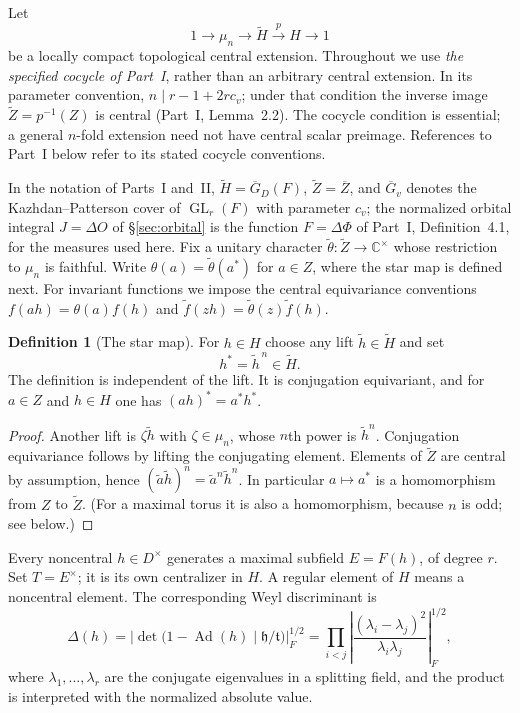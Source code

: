 \documentclass[11pt]{article}
\newcommand{\C}{\mathbb C}
\newcommand{\GL}{\operatorname{GL}}
\newcommand{\tH}{\widetilde H}
\newcommand{\tZ}{\widetilde Z}
\newcommand{\Gb}{\overline{G}}\newcommand{\GDb}{\overline{G}_D}\newcommand{\Zb}{\overline{Z}}
\theoremstyle{plain}
\theoremstyle{definition}
\newtheorem{definition}[theorem]{Definition}
\begin{document}
Let
\begin{equation}\label{eq:extension}
1\longrightarrow\mu_n\longrightarrow\tH\overset{p}{\longrightarrow}H\longrightarrow1
\end{equation}
be a locally compact topological central extension. Throughout we use \emph{the specified cocycle of Part~I}, rather than an arbitrary central extension. In its parameter convention, $n\mid r-1+2rc_v$; under that condition the inverse image $\tZ=p^{-1}(Z)$ is central (Part~I, Lemma~2.2). The cocycle condition is essential; a general $n$-fold extension need not have central scalar preimage. References to Part~I below refer to its stated cocycle conventions.

In the notation of Parts~I and~II, $\tH=\GDb(F)$, $\tZ=\Zb$, and $\Gb_v$ denotes the Kazhdan--Patterson cover of $\GL_r(F)$ with parameter $c_v$; the normalized orbital integral $J=\Delta O$ of \S\ref{sec:orbital} is the function $F=\Delta\Phi$ of Part~I, Definition~4.1, for the measures used here. Fix a unitary character $\widetilde\theta:\tZ\to\C^\times$ whose restriction to $\mu_n$ is faithful. Write $\theta(a)=\widetilde\theta(a^*)$ for $a\in Z$, where the star map is defined next. For invariant functions we impose the central equivariance conventions $f(ah)=\theta(a)f(h)$ and $\widetilde f(zh)=\widetilde\theta(z)\widetilde f(h)$.

\begin{definition}[The star map]\label{def:star}
For $h\in H$ choose any lift $\widetilde h\in\tH$ and set
\begin{equation}\label{eq:star}
h^*=\widetilde h^{\,n}\in\tH.
\end{equation}
The definition is independent of the lift. It is conjugation equivariant, and for $a\in Z$ and $h\in H$ one has $(ah)^*=a^*h^*$.
\end{definition}
\begin{proof}
Another lift is $\zeta\widetilde h$ with $\zeta\in\mu_n$, whose $n$th power is $\widetilde h^n$. Conjugation equivariance follows by lifting the conjugating element. Elements of $\tZ$ are central by assumption, hence $(\widetilde a\widetilde h)^n=\widetilde a^n\widetilde h^n$. In particular $a\mapsto a^*$ is a homomorphism from $Z$ to $\tZ$. (For a maximal torus it is also a homomorphism, because $n$ is odd; see below.)
\end{proof}

Every noncentral $h\in D^\times$ generates a maximal subfield $E=F(h)$, of degree $r$. Set $T=E^\times$; it is its own centralizer in $H$. A regular element of $H$ means a noncentral element. The corresponding Weyl discriminant is
\begin{equation}\label{eq:disc}
\Delta(h)=\left|\det\bigl(1-\operatorname{Ad}(h)\mid \mathfrak h/\mathfrak t\bigr)\right|_F^{1/2}
=\prod_{i<j}\left|\frac{(\lambda_i-\lambda_j)^2}{\lambda_i\lambda_j}\right|_F^{1/2},
\end{equation}
where $\lambda_1,\dots,\lambda_r$ are the conjugate eigenvalues in a splitting field, and the product is interpreted with the normalized absolute value.
\end{document}
